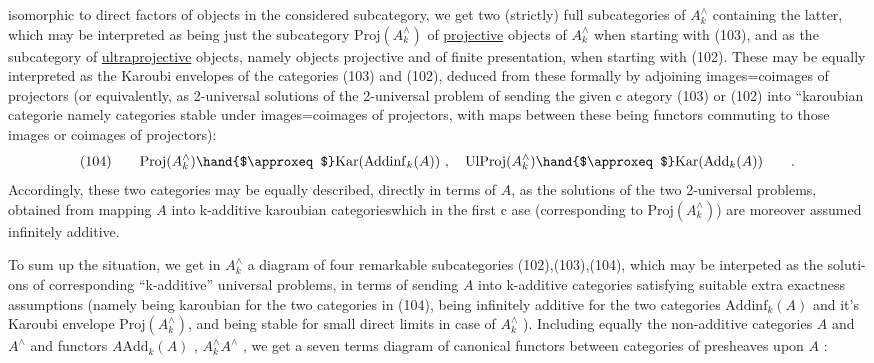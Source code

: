 
isomorphic to direct factors of objects in the considered subcategory,
we get two (strictly) full subcategories of $A^\wedge_k$ containing the latter,
which may be interpreted as being just the  subcategory
$\mathrm{Proj}(A^\wedge_k)$ of \uline{projective} objects of $A^\wedge_k$ when starting with (103), and as
the subcategory  of \uline{ultraprojective} objects, namely objects projective and
of finite presentation, when starting with (102). These may be equally
interpreted as the  Karoubi envelopes of the categories (103) and (102),
deduced from these formally by adjoining images\hand{(}=coimages\hand{)} of projectors
(or equivalently, as 2-universal solutions of the 2-universal problem
of sending the given c ategory (103) or (102) into ``karoubian categorie
namely categories stable under images\hand{(}=coimages\hand{)} of projectors, with maps
between these being functors commuting to those images or coimages of
projectors):
\[
\text{(104)}\qquad \mathrm{Proj}(A^\wedge_k)\hand{$\approxeq$}\mathrm{Kar}(\mathrm{Addinf}_k(A))\ ,\quad \mathrm{UlProj}(A^\wedge_k)\hand{$\approxeq$}\mathrm{Kar}(\mathrm{Add}_k(A))\qquad .
\]
Accordingly, these two categories may be equally described, directly in
terms of $A$, as the solutions of the two 2-universal problems, obtained
from mapping $A$ into k-additive  karoubian categories\hand{,}which in
the first c ase (corresponding  to $\mathrm{Proj}(A^\wedge_k)$) are moreover
assumed infinitely additive.

To sum up the situation, we get in $A^\wedge_k$ a diagram of four remarkable
 subcategories (102),(103),(104), which may be interpeted  as the soluti-%
ons of  corresponding  ``k-additive'' universal problems, in
terms of sending $A$ into k-additive categories satisfying suitable extra
exactness assumptions (namely being karoubian for the two categories in
(104), being infinitely additive for the two categories $\mathrm{Addinf}_k(A)$ and
it's Karoubi envelope $\mathrm{Proj}(A^\wedge_k)$, and being stable for small direct limits
in case of $A^\wedge_k$ ). Including equally the non-additive categories $A$ and $A^\wedge$
and  functors $A$\hand{$\longrightarrow$}$\mathrm{Add}_k(A)$ , $A^\wedge_k$\hand{$\longrightarrow$}$A^\wedge$ , we get a seven terms diagram of
canonical functors between categories of presheaves upon $A$ :

